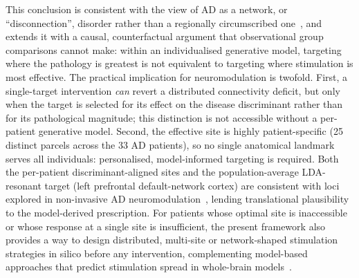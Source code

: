 \documentclass[11pt]{article}
\begin{document}
This conclusion is consistent with the view of AD as a network, or
``disconnection'', disorder rather than a regionally circumscribed
one~\cite{delbeuck2003,seeley2009}, and extends it with a causal, counterfactual
argument that observational group comparisons cannot make: within an
individualised generative model, targeting where the pathology is greatest is
not equivalent to targeting where stimulation is most effective. The practical
implication for neuromodulation is twofold. First, a single-target intervention
\emph{can} revert a distributed connectivity deficit, but only when the target
is selected for its effect on the disease discriminant rather than for its
pathological magnitude; this distinction is not accessible without a per-patient
generative model. Second, the effective site is highly patient-specific (25
distinct parcels across the 33 AD patients), so no single anatomical landmark
serves all individuals: personalised, model-informed targeting is required. Both
the per-patient discriminant-aligned sites and the population-average LDA-resonant
target (left prefrontal default-network cortex) are consistent with loci explored
in non-invasive AD neuromodulation~\cite{fox2014,koch2022}, lending translational
plausibility to the model-derived prescription. For patients whose optimal site
is inaccessible or whose response at a single site is insufficient, the present
framework also provides a way to design distributed, multi-site or network-shaped
stimulation strategies in silico before any intervention, complementing
model-based approaches that predict stimulation spread in whole-brain
models~\cite{spiegler2016,muldoon2016,kunze2016,deco2019}.
\end{document}
